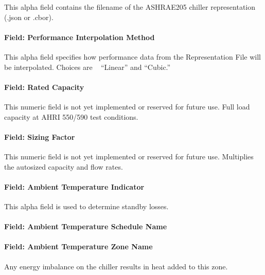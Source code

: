 This alpha field contains the filename of the ASHRAE205 chiller representation (.json or .cbor).

\paragraph{Field: Performance Interpolation Method}\label{field-chiller205-performance-interpolation-method}

This alpha field specifies how performance data from the Representation File will be interpolated. Choices are ~ ``Linear'' and ``Cubic.''~

\paragraph{Field: Rated Capacity}\label{field-chiller205-rated-capacity}

This numeric field is not yet implemented or reserved for future use. Full load capacity at AHRI 550/590 test conditions.

\paragraph{Field: Sizing Factor}\label{field-chiller205-sizing-factor}

This numeric field is not yet implemented or reserved for future use. Multiplies the autosized capacity and flow rates.

\paragraph{Field: Ambient Temperature Indicator}\label{field-chiller205-ambient-temperature-indicator}

This alpha field is used to determine standby losses.

\paragraph{Field: Ambient Temperature Schedule Name}\label{field-chiller205-ambient-temperature-schedule-name}

\paragraph{Field: Ambient Temperature Zone Name}\label{field-chiller205-ambient-temperature-zone-name}

Any energy imbalance on the chiller results in heat added to this zone.

